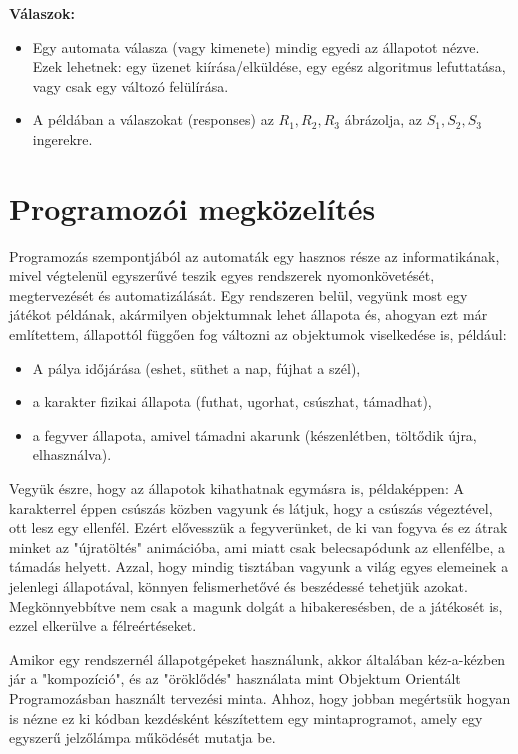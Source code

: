 \textbf{Válaszok:}
\begin{itemize}
	\item Egy automata válasza (vagy kimenete) mindig egyedi az állapotot nézve. Ezek lehetnek: egy üzenet kiírása/elküldése, egy egész algoritmus lefuttatása, vagy csak egy változó felülírása.
	\item A példában a válaszokat (responses) az $R_{1},R_{2},R_{3}$ ábrázolja, az  $S_{1},S_{2},S_{3}$ ingerekre.
\end{itemize}

\section{Programozói megközelítés}
\label{subsec:Prog}

Programozás szempontjából az automaták egy hasznos része az informatikának, mivel végtelenül egyszerűvé teszik egyes rendszerek nyomonköveté\-sét, megtervezését és automatizálását.
Egy rendszeren belül, vegyünk most egy játékot példának, akármilyen objektumnak lehet állapota és, ahogyan ezt már említet\-tem, állapottól függően fog változni az objektumok viselkedése is, például:
\begin{itemize}
	\item A pálya időjárása (eshet, süthet a nap, fújhat a szél),
	\item a karakter fizikai állapota (futhat, ugorhat, csúszhat, támadhat),
	\item a fegyver állapota, amivel támadni akarunk (készenlétben, töltődik újra, elhasználva).
\end{itemize}

Vegyük észre, hogy az állapotok kihathatnak egymásra is, példaképpen: A karakterrel éppen csúszás közben vagyunk és látjuk, hogy a csúszás végezté\-vel, ott lesz egy ellenfél. Ezért elővesszük a fegyverünket, de ki van fogyva és ez átrak minket az "újratöltés" animációba, ami miatt csak belecsapódunk az ellenfélbe, a támadás helyett. Azzal, hogy mindig tisztában vagyunk a világ egyes elemeinek a jelenlegi állapotával, könnyen felismerhetővé és beszédessé tehetjük azokat. Megkönnyebbítve nem csak a magunk dolgát a hibakeresésben, de a játékosét is, ezzel elkerülve a félreértéseket.

Amikor egy rendszernél állapotgépeket használunk, akkor általában kéz-a-kézben jár a "kompozíció", és az "öröklődés" használata mint Objektum Orientált Programozásban használt tervezési minta. Ahhoz, hogy jobban megértsük hogyan is nézne ez ki kódban kezdésként készítettem egy mintaprogramot, amely egy egyszerű jelzőlámpa működését mutatja be.

